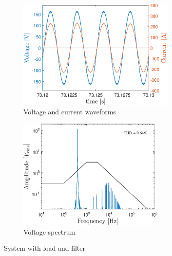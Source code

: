 \begin{doublespacing}
	\begin{figure}[!htb] %
		\centering
		\begin{subfigure}[b]{0.5\textwidth}
			\centering
			\includegraphics[height=5.5cm]{Figures/artigo_filt_3.eps}
			\caption{Voltage and current waveforms} 
			\label{fig:artigo_filt_3.eps}
		\end{subfigure}%
		\hfill
		\begin{subfigure}[b]{0.5\textwidth}  
			\centering 
			\includegraphics[height=5.5cm]{Figures/artigo_filt_4.eps}
			\caption{Voltage spectrum}    
			\label{fig:artigo_filt_4.eps}
		\end{subfigure}%
		\caption{System with load and filter}
		\label{fig:4}
	\end{figure}
	
\end{doublespacing}
\FloatBarrier